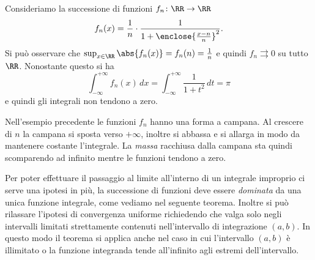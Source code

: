 \begin{example}\label{ex:convergenza_non_dominata}
  Consideriamo la successione di funzioni $f_n\colon \RR\to\RR$
  \[
    f_n(x) = \frac 1 n \cdot \frac{1}{1+\enclose{\frac{x-n} n}^2}.
  \]
  Si può osservare che $\sup_{x\in \RR} \abs{f_n(x)} = f_n(n) = \frac 1 n$ 
  e quindi $f_n \rightrightarrows 0$ su tutto $\RR$. 
  Nonostante questo si ha 
  \[
  \int_{-\infty}^{+\infty} f_n(x) \, dx  
  = \int_{-\infty}^{+\infty} \frac{1}{1+t^2}\, dt = \pi
  \]
  e quindi gli integrali non tendono a zero.
\end{example}
%
Nell'esempio precedente le funzioni $f_n$ hanno una forma a campana. 
Al crescere di $n$ la campana si sposta verso $+\infty$, inoltre si abbassa e si 
allarga in modo da mantenere costante l'integrale. 
La \emph{massa} racchiusa dalla campana sta quindi scomparendo ad infinito 
mentre le funzioni tendono a zero.

Per poter effettuare il passaggio al limite all'interno di un integrale 
improprio ci serve una ipotesi in più, la successione di funzioni 
deve essere \emph{dominata} da una unica funzione integrale, 
come vediamo nel seguente teorema. 
Inoltre si può rilassare l'ipotesi di convergenza uniforme 
richiedendo che valga solo negli intervalli  
limitati strettamente contenuti nell'intervallo di integrazione $(a,b)$. 
In questo modo il teorema si applica anche nel caso in cui l'intervallo $(a,b)$
è illimitato o la funzione integranda tende all'infinito agli estremi 
dell'intervallo.

